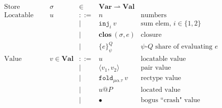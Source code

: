 \documentclass[10pt]{article}
\makeatletter
\newcommand{\kw}[1]{\ensuremath{\mathtt{#1}}}
\newcommand{\trec}[2]{\ensuremath{\mu {#1}.{#2}}}
\newcommand{\ebinop}[2]{\ensuremath{{#1}~\oplus~{#2}}}
\newcommand{\elet}[3]{\ensuremath{\kw{let}~#1\, =\, #2~\kw{in}\;{#3}}}
\newcommand{\ereveal}[4]{\ensuremath{\kw{reveal}^{#1}_{#4}~{#2}~{#3}}}
\newcommand{\econd}[3]{\ensuremath{\kw{match}~{#1}~\kw{with}~x.{#2} \diamond {#3}}}
\newcommand{\emux}[3]{\ensuremath{\kw{mux}~{#1}~\kw{?}~{#2}~\kw{:}~{#3}}}
\newcommand{\eshare}[4]{\ensuremath{\kw{share}^{#2}_{#1}~{#3}~{#4}}}
\newcommand{\einj}[2]{\ensuremath{\kw{inj}_{#1}~{#2}}}
\newcommand{\epair}[2]{\ensuremath{\langle {#1}, {#2} \rangle}}
\newcommand{\eproj}[2]{\ensuremath{\kw{\#}}_{#1}~{#2}}
\newcommand{\eapp}[2]{\ensuremath{{#1}~{#2}}}
\newcommand{\efold}[2]{\ensuremath{\kw{fold}_{#1}~{#2}}}
\newcommand{\eunfold}[1]{\ensuremath{\kw{unfold}~{#1}}}
\newcommand{\vshare}[3]{\ensuremath{\{{#3}\}^{#1}_{#2}}}
\newcommand{\vloc}[2]{\ensuremath{{#1}\kw{@}{#2}}}
\newcommand{\vclos}[2]{\ensuremath{\mathbf{clos}~({#1},{#2})}}
\newcommand{\vcrash}{\ensuremath{\bullet}}
\newcommand{\env}{\ensuremath{\sigma}}
\newcommand{\ctxt}{\ensuremath{\mathcal{E}}}
\makeatother
\begin{document}
\begin{figure}
  \[\begin{array}{rlcll}
      \text{Store} & \sigma & \in & \mathbf{Var} \rightharpoonup \mathbf{Val}\\
      \text{Locatable value} & u & ::=  & n & \text{numbers} \\
                             && \mid & \einj{i}{v} & \text{sum elem, }i \in \{1,2\}\\
                             && \mid & \vclos{\env}{e}  & \text{closure} \\
                             && \mid & \vshare{Q}{\psi}{e} & \text{$\psi$-$Q$ share of evaluating $e$} \\
      \text{Value} & v  \in \mathbf{Val} & ::=  & u & \text{locatable value}\\
                       && \mid & \epair{v_1}{v_2} & \text{pair value}\\
                       && \mid & \efold{\trec{\alpha}{\tau}}{v} & \text{rectype value}\\
                   && \mid & \vloc{u}{P} & \text{located value}\\
                   && \mid & \vcrash & \text{bogus ``crash" value}\\
    \end{array}
  \]


\end{figure}
\end{document}
